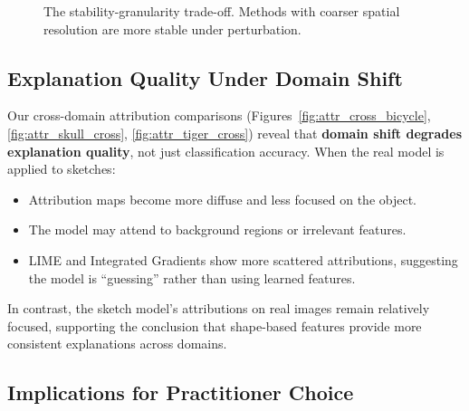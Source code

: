 \documentclass[12pt, a4paper]{article}
\begin{document}
\begin{figure}[H]
\centering
{}
\caption{The stability-granularity trade-off.  Methods with coarser spatial
resolution are more stable under perturbation.}
\label{fig:stability_tradeoff}
\end{figure}

\subsection{Explanation Quality Under Domain Shift}

Our cross-domain attribution comparisons (Figures~\ref{fig:attr_cross_bicycle},
\ref{fig:attr_skull_cross}, \ref{fig:attr_tiger_cross}) reveal that
\textbf{domain shift degrades explanation quality}, not just classification
accuracy.  When the real model is applied to sketches:

\begin{itemize}[leftmargin=*]
    \item Attribution maps become more diffuse and less focused on the object.
    \item The model may attend to background regions or irrelevant features.
    \item LIME and Integrated Gradients show more scattered attributions,
          suggesting the model is ``guessing'' rather than using learned
          features.
\end{itemize}

In contrast, the sketch model's attributions on real images remain relatively
focused, supporting the conclusion that shape-based features provide more
consistent explanations across domains.

\subsection{Implications for Practitioner Choice}
\end{document}
